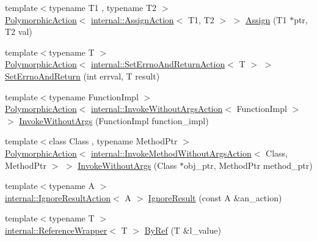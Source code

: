 \begin{DoxyCompactItemize}
\item 
{\footnotesize template$<$typename T1 , typename T2 $>$ }\\\mbox{\hyperlink{classtesting_1_1PolymorphicAction}{Polymorphic\+Action}}$<$ \mbox{\hyperlink{classtesting_1_1internal_1_1AssignAction}{internal\+::\+Assign\+Action}}$<$ T1, T2 $>$ $>$ \mbox{\hyperlink{namespacetesting_abfc4121b8708e8b22a096ff8be88a9d0}{Assign}} (T1 $\ast$ptr, T2 val)
\item 
{\footnotesize template$<$typename T $>$ }\\\mbox{\hyperlink{classtesting_1_1PolymorphicAction}{Polymorphic\+Action}}$<$ \mbox{\hyperlink{classtesting_1_1internal_1_1SetErrnoAndReturnAction}{internal\+::\+Set\+Errno\+And\+Return\+Action}}$<$ T $>$ $>$ \mbox{\hyperlink{namespacetesting_a31095e421f167fade2e6d4d60df1f4da}{Set\+Errno\+And\+Return}} (int errval, T result)
\item 
{\footnotesize template$<$typename Function\+Impl $>$ }\\\mbox{\hyperlink{classtesting_1_1PolymorphicAction}{Polymorphic\+Action}}$<$ \mbox{\hyperlink{classtesting_1_1internal_1_1InvokeWithoutArgsAction}{internal\+::\+Invoke\+Without\+Args\+Action}}$<$ Function\+Impl $>$ $>$ \mbox{\hyperlink{namespacetesting_a88cc1999296bc630f6a49cdf66bb21f9}{Invoke\+Without\+Args}} (Function\+Impl function\+\_\+impl)
\item 
{\footnotesize template$<$class Class , typename Method\+Ptr $>$ }\\\mbox{\hyperlink{classtesting_1_1PolymorphicAction}{Polymorphic\+Action}}$<$ \mbox{\hyperlink{classtesting_1_1internal_1_1InvokeMethodWithoutArgsAction}{internal\+::\+Invoke\+Method\+Without\+Args\+Action}}$<$ Class, Method\+Ptr $>$ $>$ \mbox{\hyperlink{namespacetesting_ab75325d71a8c37db94f349243815c728}{Invoke\+Without\+Args}} (Class $\ast$obj\+\_\+ptr, Method\+Ptr method\+\_\+ptr)
\item 
{\footnotesize template$<$typename A $>$ }\\\mbox{\hyperlink{classtesting_1_1internal_1_1IgnoreResultAction}{internal\+::\+Ignore\+Result\+Action}}$<$ A $>$ \mbox{\hyperlink{namespacetesting_a50ae42540a31047c7fddd32df8d835f5}{Ignore\+Result}} (const A \&an\+\_\+action)
\item 
{\footnotesize template$<$typename T $>$ }\\\mbox{\hyperlink{classtesting_1_1internal_1_1ReferenceWrapper}{internal\+::\+Reference\+Wrapper}}$<$ T $>$ \mbox{\hyperlink{namespacetesting_aaee6d42dcd69de6e7a1459c5c71222c3}{By\+Ref}} (T \&l\+\_\+value)

\end{DoxyCompactItemize}
